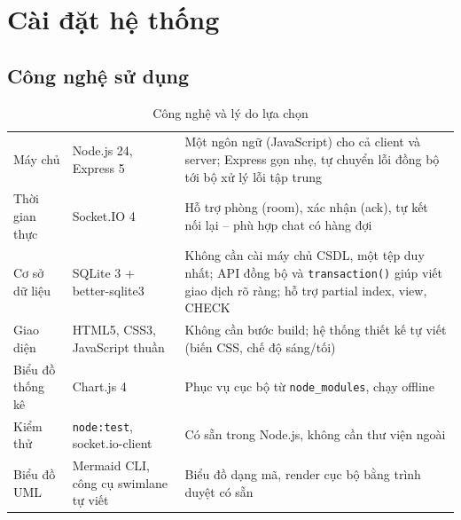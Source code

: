 \chapter{Cài đặt hệ thống}
\label{ch:impl}

\section{Công nghệ sử dụng}
\begin{table}[H]\centering
\caption{Công nghệ và lý do lựa chọn}\label{tab:tech}
\begin{tabularx}{\linewidth}{|L{3.3cm}|L{3.4cm}|Y|}
  \hline
  \headrow {} &  &  \\ \hline
  Máy chủ & Node.js 24, Express 5 & Một ngôn ngữ (JavaScript) cho cả client và server; Express gọn nhẹ, tự chuyển lỗi đồng bộ tới bộ xử lý lỗi tập trung \\ \hline
  Thời gian thực & Socket.IO 4 & Hỗ trợ phòng (room), xác nhận (ack), tự kết nối lại – phù hợp chat có hàng đợi \\ \hline
  Cơ sở dữ liệu & SQLite 3 + better-sqlite3 & Không cần cài máy chủ CSDL, một tệp duy nhất; API đồng bộ và \texttt{transaction()} giúp viết giao dịch rõ ràng; hỗ trợ partial index, view, CHECK \\ \hline
  Giao diện & HTML5, CSS3, JavaScript thuần & Không cần bước build; hệ thống thiết kế tự viết (biến CSS, chế độ sáng/tối) \\ \hline
  Biểu đồ thống kê & Chart.js 4 & Phục vụ cục bộ từ \texttt{node\_modules}, chạy offline \\ \hline
  Kiểm thử & \texttt{node:test}, socket.io-client & Có sẵn trong Node.js, không cần thư viện ngoài \\ \hline
  Biểu đồ UML & Mermaid CLI, công cụ swimlane tự viết & Biểu đồ dạng mã, render cục bộ bằng trình duyệt có sẵn \\ \hline
\end{tabularx}
\end{table}

